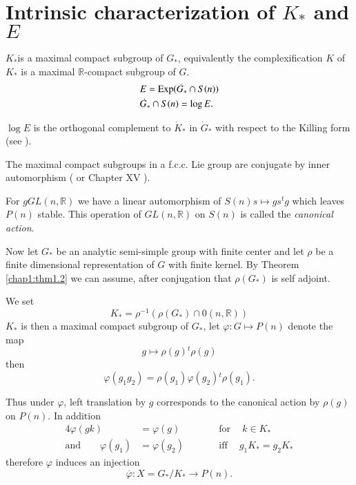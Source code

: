 
\chapter{Intrinsic characterization of $K_*$ and $E$} \label{chap2}

$K_*$\pageoriginale is a maximal compact subgroup of $G_*$, equivalently the
complexification $K$ of $K_*$ is a maximal $\mathbb{R}$-compact
subgroup of $G$.
\begin{align*}
  & E= \operatorname{Exp} (\dot{G}_* \cap S(n))\\
  & \dot{G}_* \cap S(n) = \log E.
\end{align*}

$\log E$ is the orthogonal complement to $\dot{K}_*$ in $\dot{G}_*$
with respect to the Killing form (see \cite{13}).

\begin{thm}\label{chap2:thm2.1} %
  The maximal compact subgroups in a f.c.c. Lie group are conjugate by
  inner automorphism (\cite{13} or Chapter XV \cite{9}).
\end{thm}

For $g GL (n, \mathbb{R})$ we have a linear automorphism of $S(n) s
\mapsto g s {}^tg$ which leaves $P(n)$ stable. This operation of $GL
(n, \mathbb{R})$ on $S(n)$ is called the \textit{canonical action}.

Now let $G_*$ be an analytic semi-simple group with finite center and
let $\rho$ be a finite dimensional representation of $G$ with finite
kernel. By Theorem \ref{chap1:thm1.2} we can assume, after
conjugation that $\rho (G_*)$ is self adjoint.

We set
$$
K_* = \rho^{-1} (\rho (G_*) \cap 0(n, \mathbb{R}))
$$
$K_*$ is then a maximal compact subgroup of $G_*$, let $\varphi : G
\mapsto P(n)$ denote the map
$$
g \mapsto \rho (g) {}^t \rho (g)
$$
then\pageoriginale 
$$
\varphi (g_1 g_2)= \rho (g_1) \varphi (g_2) {}^t\rho (g_1).
$$

Thus under $\varphi$, left translation by $g$ corresponds to the
canonical action by $\rho (g)$ on $P(n)$. In addition
\begin{alignat*}{4}
  \varphi (gk) & = \varphi (g) & &\text{for}~ \quad k \in K_*\\
  \text{and} \qquad \varphi (g_1) & = \varphi (g_2) \qquad &
  &\text{iff}~\quad   g_1 K_* =  g_2 K_*
\end{alignat*}
therefore $\varphi$ induces an injection
$$
\overline{\varphi} : X = G_*/K_* \to P(n).
$$

